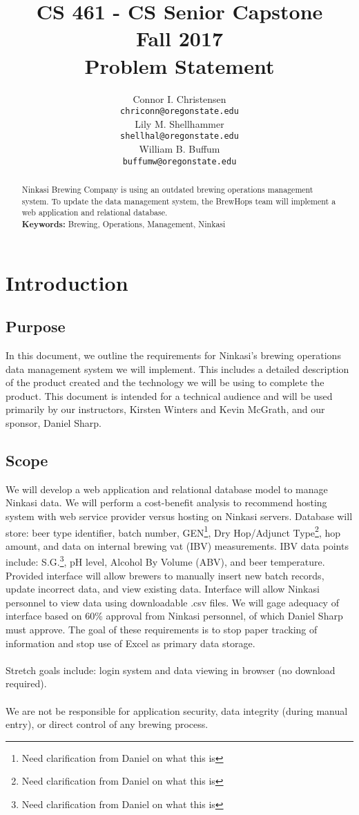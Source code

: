 \documentclass[draftclsnofoot,onecolumn,letterpaper,10pt,compsoc]{IEEEtran}
\title{CS 461 - CS Senior Capstone
	\\Fall 2017
	\\Problem Statement
}
\author{
	Connor I. Christensen \\
	\texttt{chriconn@oregonstate.edu}
	\\
	Lily M. Shellhammer \\
	\texttt{shellhal@oregonstate.edu}
	\\
	William B. Buffum \\
	\texttt{buffumw@oregonstate.edu}
}
\begin{document}
\begin{titlingpage}
    \maketitle
    \begin{abstract}
			Ninkasi Brewing Company is using an outdated brewing operations management system. To update the data management system, the BrewHops team will implement a web application and relational database.
			\\
			\textbf{Keywords:} Brewing, Operations, Management, Ninkasi
    \end{abstract}
		\pagebreak
		\tableofcontents
\end{titlingpage}

\section{Introduction}
	\subsection{Purpose}
    In this document, we outline the requirements for Ninkasi’s brewing operations data management system we will implement. This includes a detailed description of the product created and the technology we will be using to complete the product. This document is intended for a technical audience and will be used primarily by our instructors, Kirsten Winters and Kevin McGrath, and our sponsor, Daniel Sharp.
    
	\subsection{Scope}
    We will develop a web application and relational database model to manage Ninkasi data. We will perform a cost-benefit analysis to recommend hosting system with web service provider versus hosting on Ninkasi servers. Database will store: beer type identifier, batch number, GEN\footnote{Need clarification from Daniel on what this is}, Dry Hop/Adjunct Type\footnote{Need clarification from Daniel on what this is}, hop amount, and data on internal brewing vat (IBV) measurements. IBV data points include: S.G.\footnote{Need clarification from Daniel on what this is}, pH level, Alcohol By Volume (ABV), and beer temperature. Provided interface will allow brewers to manually insert new batch records, update incorrect data, and view existing data. Interface will allow Ninkasi personnel to view data using downloadable .csv files. We will gage adequacy of interface based on 60\% approval from Ninkasi personnel, of which Daniel Sharp must approve. The goal of these requirements is to stop paper tracking of information and stop use of Excel as primary data storage.
    \\
    \\
    Stretch goals include: login system and data viewing in browser (no download required).
    \\
    \\
    We are not be responsible for application security, data integrity (during manual entry), or direct control of any brewing process.
    
\end{document}
